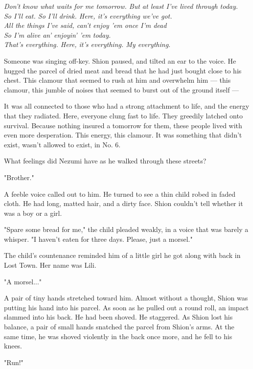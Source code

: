 \myspace

\emph{Don't know what waits for me tomorrow. But at least I've lived through
today.\\
So I'll eat. So I'll drink. Here, it's everything we've got.\\
All the things I've said, can't enjoy 'em once I'm dead\\
So I'm alive an' enjoyin' 'em today.\\
That's everything. Here, it's everything. My everything.}

\myspace

Someone was singing off-key. Shion paused, and tilted an ear to the
voice. He hugged the parcel of dried meat and bread that he had just
bought close to his chest. This clamour that seemed to rush at him and
overwhelm him --- this clamour, this jumble of noises that seemed to burst
out of the ground itself ---

It was all connected to those who had a strong attachment to life, and
the energy that they radiated. Here, everyone clung fast to life. They
greedily latched onto survival. Because nothing insured a tomorrow for
them, these people lived with even more desperation. This energy, this
clamour. It was something that didn't exist, wasn't allowed to exist, in
No. 6.

What feelings did Nezumi have as he walked through these streets?

"Brother."

A feeble voice called out to him. He turned to see a thin child robed in
faded cloth. He had long, matted hair, and a dirty face. Shion couldn't
tell whether it was a boy or a girl.

"Spare some bread for me," the child pleaded weakly, in a voice that was
barely a whisper. "I haven't eaten for three days. Please, just a
morsel."

The child's countenance reminded him of a little girl he got along with
back in Lost Town. Her name was Lili.

"A morsel..."

A pair of tiny hands stretched toward him. Almost without a thought,
Shion was putting his hand into his parcel. As soon as he pulled out a
round roll, an impact slammed into his back. He had been shoved. He
staggered. As Shion lost his balance, a pair of small hands snatched the
parcel from Shion's arms. At the same time, he was shoved violently in
the back once more, and he fell to his knees.

"Run!"

